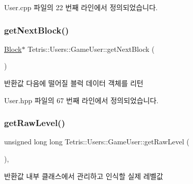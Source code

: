 User.\+cpp 파일의 22 번째 라인에서 정의되었습니다.

\mbox{\label{class_tetris_1_1_users_1_1_game_user_a9fdd8809e412f1d9a665c0cfb15af48d}} 
\subsubsection{\texorpdfstring{get\+Next\+Block()}{getNextBlock()}\hspace{0.1cm}{\footnotesize\ttfamily [2/2]}}
{\footnotesize\ttfamily \hyperlink{class_tetris_1_1_block}{Block}$\ast$ Tetris\+::\+Users\+::\+Game\+User\+::get\+Next\+Block (\begin{DoxyParamCaption}{ }\end{DoxyParamCaption})\hspace{0.3cm}{\ttfamily [inline]}}

\begin{DoxyReturn}{반환값}
다음에 떨어질 블럭 데이터 객체를 리턴 
\end{DoxyReturn}


User.\+hpp 파일의 67 번째 라인에서 정의되었습니다.

\mbox{\label{class_tetris_1_1_users_1_1_game_user_a3e232d2f4a0610e51136bec11453858b}} 
\subsubsection{\texorpdfstring{get\+Raw\+Level()}{getRawLevel()}}
{\footnotesize\ttfamily unsigned long long Tetris\+::\+Users\+::\+Game\+User\+::get\+Raw\+Level (\begin{DoxyParamCaption}{ }\end{DoxyParamCaption})\hspace{0.3cm}{\ttfamily [inline]}, {\ttfamily [protected]}}

\begin{DoxyReturn}{반환값}
내부 클래스에서 관리하고 인식할 실제 레벨값 
\end{DoxyReturn}


